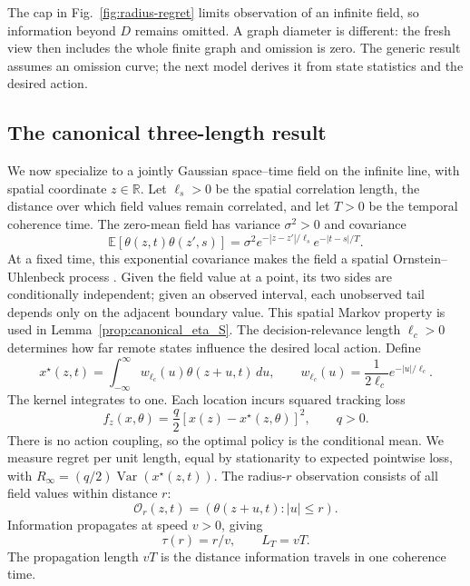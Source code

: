 \documentclass[11pt]{article}
\begin{document}
The cap in Fig.~\ref{fig:radius-regret} limits observation of an infinite
field, so information beyond $D$ remains omitted. A graph diameter is
different: the fresh view then includes the whole finite graph and omission
is zero. The generic result assumes an omission curve; the next model
derives it from state statistics and the desired action.

\subsection{The canonical three-length result}
\label{subsec:canonical_line_model}

We now specialize to a jointly Gaussian space--time field on the infinite line,
with spatial coordinate $z\in\mathbb R$. Let $\ell_s>0$ be the spatial correlation length, the
distance over which field values remain correlated, and let $T>0$ be the
temporal coherence time. The zero-mean field has variance $\sigma^2>0$ and covariance
\begin{equation}
\mathbb E[\theta(z,t)\theta(z',s)]
=\sigma^2e^{-|z-z'|/\ell_s}e^{-|t-s|/T}.
\label{eq:canonical_space_time_covariance}
\end{equation}
At a fixed time, this exponential covariance makes the field a spatial
Ornstein--Uhlenbeck process \cite{williams2006gaussian}. Given the field
value at a point, its two sides are conditionally independent; given an
observed interval, each unobserved tail depends only on the adjacent boundary
value. This spatial Markov property is used in Lemma~\ref{prop:canonical_eta_S}.
The decision-relevance length $\ell_c>0$ determines how far remote states
influence the desired local action. Define
\begin{equation}
x^\star(z,t)=\int_{-\infty}^{\infty}w_{\ell_c}(u)\theta(z+u,t)\,du,
\qquad w_{\ell_c}(u)=\frac{1}{2\ell_c}e^{-|u|/\ell_c}.
\label{eq:canonical_target}
\end{equation}
The kernel integrates to one. Each location incurs squared tracking loss
\begin{equation}
f_z(x,\theta)=\frac q2[x(z)-x^\star(z,\theta)]^2,\qquad q>0.
\label{eq:canonical_tracking_cost}
\end{equation}
There is no action coupling, so the optimal policy is the conditional mean.
We measure regret per unit length, equal by stationarity to expected
pointwise loss, with $R_\infty=(q/2)\operatorname{Var}(x^\star(z,t))$.
The radius-$r$ observation consists of all field values within distance $r$:
\begin{equation}
\mathcal O_r(z,t)=(\theta(z+u,t):|u|\le r).
\label{eq:canonical_radius_observation}
\end{equation}
Information propagates at speed $v>0$, giving
\begin{equation}
\tau(r)=r/v,\qquad L_T=vT.
\label{eq:temporal_propagation_length}
\end{equation}
The propagation length $vT$ is the distance information travels in one
coherence time.
\end{document}
